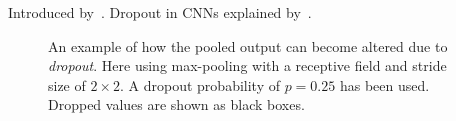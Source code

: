 Introduced by~\cite{dropout-original-paper}.
Dropout in CNNs explained by~\cite{dropout-cnn}.

\begin{figure}[htb]
  
  \caption{%
    An example of how the pooled output can become altered due to \textit{dropout}.
    Here using max-pooling with a receptive field and stride size of $2 \times 2$.
    A dropout probability of $p = 0.25$ has been used.
    Dropped values are shown as black boxes.
  }%
  \label{fig:dropout}
\end{figure}
